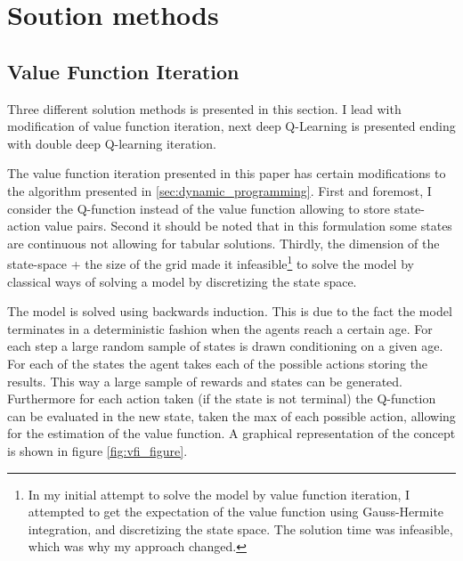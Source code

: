 \section{Soution methods}\label{sec:solution_methods}

\subsection{Value Function Iteration}

Three different solution methods is presented in this section. I lead with modification of value function iteration, next deep Q-Learning is presented ending with double deep Q-learning iteration.

The value function iteration presented in this paper has certain modifications to the algorithm presented in \ref{sec:dynamic_programming}. First and foremost, I consider the Q-function instead of the value function allowing to store state-action value pairs. Second it should be noted that in this formulation some states are continuous not allowing for tabular solutions. Thirdly, the dimension of the state-space + the size of the grid made it infeasible\footnote{In my initial attempt to solve the model by value function iteration, I attempted to get the expectation of the value function using Gauss-Hermite integration, and discretizing the state space. The solution time was infeasible, which was why my approach changed.} to solve the model by classical ways of solving a model by discretizing the state space. 

The model is solved using backwards induction. This is due to the fact the model terminates in a deterministic fashion when the agents reach a certain age. For each step a large random sample of states is drawn conditioning on a given age. For each of the states the agent takes each of the possible actions storing the results. This way a large sample of rewards and states can be generated. Furthermore for each action taken (if the state is not terminal) the  Q-function can be evaluated in the new state, taken the max of each possible action, allowing for the estimation of the value function. A graphical representation of the concept is shown in figure \ref{fig:vfi_figure}. 

